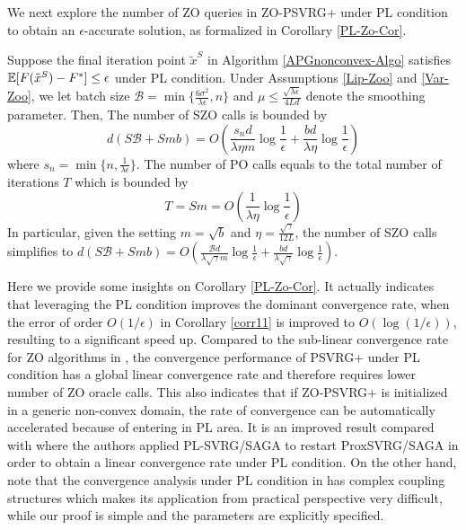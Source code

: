 We next explore the number of ZO queries in ZO-PSVRG+ under PL condition to obtain an $\epsilon$-accurate solution, as formalized in Corollary \ref{PL-Zo-Cor}. 
\begin{corollary}\label{PL-Zo-Cor}
Suppose the final iteration point $\tilde{x}^S$ in Algorithm \ref{APGnonconvex-Algo} satisfies $\mathbb{E}[F(\tilde{x}^S) - F^*]\leq \epsilon$ under PL condition. Under Assumptions \ref{Lip-Zoo} and \ref{Var-Zoo}, we let batch size $\mathcal{B} = \min\{\frac{6\sigma^2}{\lambda\epsilon},n\}$ and  $\mu \leq \frac{\sqrt{\lambda\epsilon}}{4 L d}$ denote the smoothing parameter. Then, The number of SZO calls is bounded by
\[
d(S\mathcal{B}+Smb) = O(\frac{s_n d}{\lambda\eta m}\log\frac{1}{\epsilon}+\frac{b d}{\lambda\eta}\log\frac{1}{\epsilon})
\]
where $s_n = \min \{n,\frac{1}{\lambda \epsilon}\}$.
The number of PO calls equals to the total number of iterations $T$ which is bounded by
\[
 T = Sm = O(\frac{1}{\lambda\eta}\log\frac{1}{\epsilon})
\]
In particular, given the setting  $m=\sqrt{b}$ and $\eta = \frac{\sqrt{\gamma}}{12 L}$, the number of SZO calls  simplifies to 
$d(S\mathcal{B}+Smb) = O(\frac{\mathcal{B}d}{\lambda\sqrt{\gamma} m}\log\frac{1}{\epsilon}+\frac{bd}{\lambda\sqrt{\gamma}}\log\frac{1}{\epsilon})$.
\end{corollary}

Here we provide some insights on Corollary \ref{PL-Zo-Cor}. It actually indicates that leveraging the PL condition improves the dominant convergence rate, when the error of
order $O(1/\epsilon)$ in Corollary \ref{corr11} is improved to $O(\log(1/\epsilon))$, resulting to a significant speed up.
Compared to the sub-linear convergence rate for ZO algorithms in \cite{duchi2015optimal,nesterov2017random,liu2018zeroth}, the convergence performance of PSVRG+ under PL condition has a global linear convergence rate and therefore requires lower number of ZO oracle calls. 
This also indicates that if ZO-PSVRG+ is initialized in a generic non-convex domain, the rate of convergence can be automatically accelerated because of entering in PL area. It is an improved result compared with \cite{reddi2016stochastic} where the authors applied PL-SVRG/SAGA to restart ProxSVRG/SAGA in order to obtain a linear convergence rate under PL condition. On the other hand, note that the convergence analysis under PL condition in \cite{ji2019improved} has complex coupling structures which makes its application from practical perspective very difficult, while our proof is simple and the parameters are explicitly specified.

